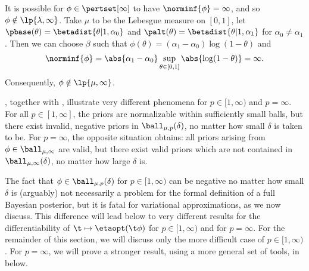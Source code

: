 \begin{ex}
%
It is possible for $\phi \in \pertset[\infty]$ to have $\norminf{\phi} =
\infty$, and so $\phi \notin \lp{\lambda,\infty}$.  Take $\mu$ to be the
Lebesgue measure on $[0,1]$, let $\pbase(\theta) = \betadist{\theta \vert 1,
\alpha_0}$ and $\palt(\theta) = \betadist{\theta \vert 1, \alpha_1}$ for
$\alpha_0 \ne \alpha_1$.  Then we can choose $\beta$ such that $\phi(\theta) =
(\alpha_1 - \alpha_0) \log(1 - \theta)$
%
and
%
\begin{align*}
%
\norminf{\phi} =
    \abs{\alpha_1 - \alpha_0} \sup_{\theta \in [0,1]} \abs{\log(1 - \theta)} =
    \infty.
%
\end{align*}
%
Consequently, $\phi \notin \lp{\mu,\infty}$.
%
\end{ex}

, together with ,
illustrate very different phenomena for $p \in [1, \infty)$ and $p = \infty$.
For all $p \in [1, \infty]$, the priors are normalizable within sufficiently
small balls, but there exist invalid, negative priors in
$\ball_{\mu,p}(\delta)$, no matter how small $\delta$ is taken to be.   For
$p=\infty$, the opposite situation obtains: all priors arising from $\phi \in
\ball_{\mu,\infty}$ are valid, but there exist valid priors which are not
contained in $\ball_{\mu,\infty}(\delta)$, no matter how large $\delta$ is.

The fact that $\phi \in \ball_{\mu,p}(\delta)$ for $p \in [1, \infty)$ can be
negative no matter how small $\delta$ is (arguably) not necessarily a problem
for the formal definition of a full Bayesian posterior, but it is fatal for
variational approximations, as we now discuss.  This difference will lead below
to very different results for the differentiability of $\t \mapsto \etaopt(\t
\phi)$ for $p \in [1, \infty)$ and for $p = \infty$.
%
For the remainder of this section, we will discuss only the more difficult case
of $p \in [1, \infty)$.  For $p=\infty$, we will prove a stronger result, using
a more general set of tools, in  below.

